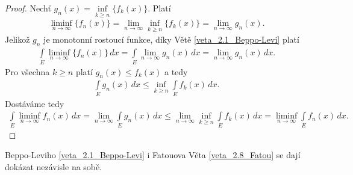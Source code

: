 \begin{proof}
Nechť $g_n(x)=\inf \limits _{k \geq n} \{f_k(x)\}$. Platí
\begin{align*}
\liminf \limits _{n \to \infty} \{f_n(x)\}= \lim \limits _{n \to \infty} \inf \limits _{k \geq n} \{f_k(x)\}= \lim \limits _{n \to \infty} g_n(x).
\end{align*}
Jelikož $g_n$ je monotonní rostoucí funkce, díky Větě \ref{veta_2.1_Beppo-Levi} platí
\begin{align*}
\int \limits _{E} \liminf \limits _{n \to \infty} \{f_n(x)\} \, dx= \int \limits _{E} \lim \limits _{n \to \infty} g_n(x) \, dx = \lim \limits _{n \to \infty} g_n(x) \, dx.
\end{align*}
Pro všechna $k \geq n$ platí $g_n(x) \leq f_k(x)$ a tedy
\begin{align*}
\int \limits _{E} g_n(x) \, dx \leq \inf \limits _{k\geq n} \int \limits _{E} f_k(x) \, dx.
\end{align*}
Dostáváme tedy
\begin{align*}
\int \limits _{E} \liminf_{n \to \infty} f_n(x) \, dx  = \lim \limits _{n \to \infty} \int \limits _{E} g_n(x) \, dx \leq \lim \limits _{n \to \infty} \inf \limits _{k \geq n} \int \limits _{E} f_k(x) \, dx = \liminf \limits _{n \to \infty}  \int \limits _{E} f_n(x) \, dx.
\end{align*}
\end{proof}

\begin{poznamka}
Beppo-Leviho \ref{veta_2.1_Beppo-Levi} i Fatouova Věta \ref{veta_2.8_Fatou} se dají dokázat nezávisle na sobě.
\end{poznamka}



